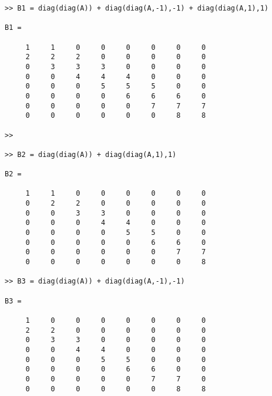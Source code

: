 \begin{enumerate}
\begin{svol}
\begin{codice}
\begin{verbatim}
>> B1 = diag(diag(A)) + diag(diag(A,-1),-1) + diag(diag(A,1),1)

B1 =

     1     1     0     0     0     0     0     0
     2     2     2     0     0     0     0     0
     0     3     3     3     0     0     0     0
     0     0     4     4     4     0     0     0
     0     0     0     5     5     5     0     0
     0     0     0     0     6     6     6     0
     0     0     0     0     0     7     7     7
     0     0     0     0     0     0     8     8

>> 

>> B2 = diag(diag(A)) + diag(diag(A,1),1)

B2 =

     1     1     0     0     0     0     0     0
     0     2     2     0     0     0     0     0
     0     0     3     3     0     0     0     0
     0     0     0     4     4     0     0     0
     0     0     0     0     5     5     0     0
     0     0     0     0     0     6     6     0
     0     0     0     0     0     0     7     7
     0     0     0     0     0     0     0     8

>> B3 = diag(diag(A)) + diag(diag(A,-1),-1)

B3 =

     1     0     0     0     0     0     0     0
     2     2     0     0     0     0     0     0
     0     3     3     0     0     0     0     0
     0     0     4     4     0     0     0     0
     0     0     0     5     5     0     0     0
     0     0     0     0     6     6     0     0
     0     0     0     0     0     7     7     0
     0     0     0     0     0     0     8     8

\end{verbatim}
\end{codice}
\end{svol}


\end{enumerate}
